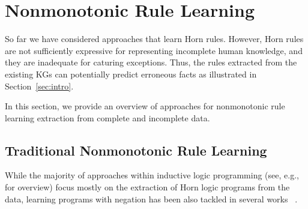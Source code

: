 \section{Nonmonotonic Rule Learning}\label{sec:nmrulelearn}

So far %
we have considered %
approaches that learn Horn rules. However,  Horn rules are not sufficiently expressive for representing incomplete human knowledge, and they are inadequate for caturing
exceptions. Thus, the rules extracted from the existing KGs can potentially %
predict erroneous facts as illustrated in Section~\ref{sec:intro}. %


In this section, we provide an overview of approaches for nonmonotonic rule learning extraction from complete and incomplete data. 




\subsection{Traditional Nonmonotonic Rule Learning}
While the majority of approaches within inductive logic programming (see, e.g., \cite{DBLP:journals/cacm/GulwaniHKMSZ15,DBLP:journals/ml/MuggletonRPBFIS12} for overview) focus mostly on the extraction of Horn logic programs from the data, learning programs with negation has been also tackled in several works %
~\cite{DBLP:conf/ijcai/InoueK97,DBLP:journals/tocl/Sakama05,XHAIL,CorapiRL10,ILASP_system}. %

